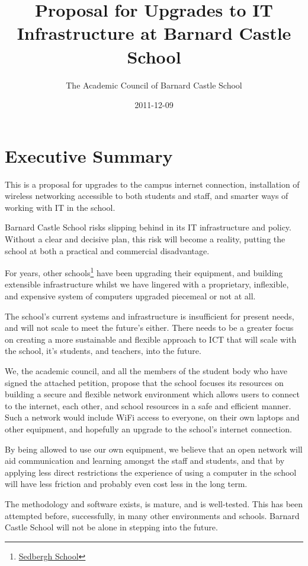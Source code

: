 \documentclass[a4paper,leqno,titlepage]{article}
\title{Proposal for Upgrades to IT Infrastructure at Barnard Castle School}
\author{The Academic Council of Barnard Castle School}
\date{2011-12-09}
\begin{document}
\maketitle

\section{Executive Summary}

This is a proposal for upgrades to the campus internet connection,
installation of wireless networking accessible to both students and staff,
and smarter ways of working with IT in the school. 

Barnard Castle School risks slipping behind in its
IT infrastructure and policy.
Without a clear and decisive plan, this risk will become a reality, putting
the school at both a practical and commercial disadvantage.


For years, other schools\footnote{\href{http://www.sedberghschool.org/ict.html}{Sedbergh School}} 
have been upgrading their equipment, and building extensible infrastructure
whilst we have lingered with a proprietary, inflexible, and expensive system of
computers upgraded piecemeal or not at all.


The school's current systems and infrastructure is insufficient for present
needs, and will not scale to meet the future's either.
There needs to be a greater focus on creating a more sustainable and flexible
approach to ICT that will scale with the school, it's students, and teachers,
into the future.


We, the academic council, and all the members of the student body who have signed
the attached petition, propose that the school focuses its resources on building
a secure and flexible network environment which allows users to connect to the
internet, each other, and school resources in a safe and efficient manner.
Such a network would include WiFi access to everyone, on their own laptops and
other equipment, and hopefully an upgrade to the school's internet connection.


By being allowed to use our own equipment, we believe that an open network will
aid communication and learning amongst the staff and students, and that by
applying less direct restrictions the experience of using a computer in the
school will have less friction and probably even cost less in the long term.


The methodology and software exists, is mature, and is well-tested. This has been
attempted before, successfully, in many other environments and schools.
Barnard Castle School will not be alone in stepping into the future.
\end{document}
